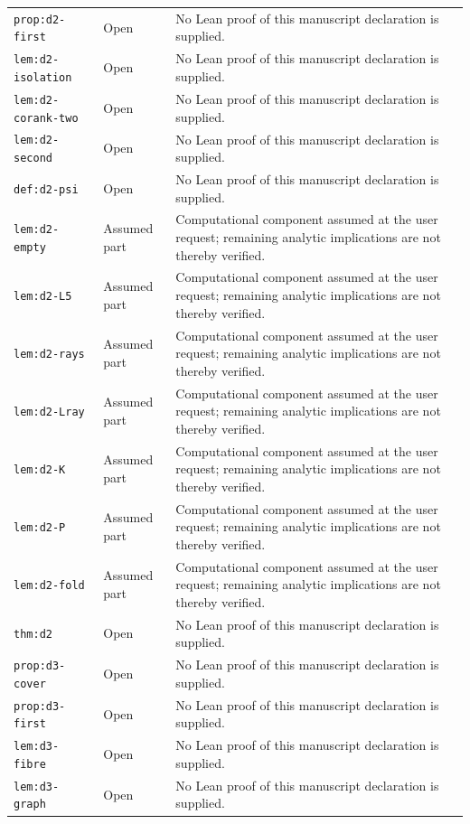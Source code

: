 \documentclass[Threeside,11pt]{article}
\theoremstyle{definition}
\theoremstyle{remark}
\numberwithin{equation}{section}
\theoremstyle{remark}
\newcommand{\code}[1]{\begingroup\def\_{\textunderscore\allowbreak}\texttt{#1}\endgroup}
\begin{document}
\begin{longtable}{p{4.0cm}p{1.8cm}p{8.9cm}}
\code{prop:d2-first} & Open & No Lean proof of this manuscript declaration is supplied. \\
\code{lem:d2-isolation} & Open & No Lean proof of this manuscript declaration is supplied. \\
\code{lem:d2-corank-two} & Open & No Lean proof of this manuscript declaration is supplied. \\
\code{lem:d2-second} & Open & No Lean proof of this manuscript declaration is supplied. \\
\code{def:d2-psi} & Open & No Lean proof of this manuscript declaration is supplied. \\
\code{lem:d2-empty} & Assumed part & Computational component assumed at the user request; remaining analytic implications are not thereby verified. \\
\code{lem:d2-L5} & Assumed part & Computational component assumed at the user request; remaining analytic implications are not thereby verified. \\
\code{lem:d2-rays} & Assumed part & Computational component assumed at the user request; remaining analytic implications are not thereby verified. \\
\code{lem:d2-Lray} & Assumed part & Computational component assumed at the user request; remaining analytic implications are not thereby verified. \\
\code{lem:d2-K} & Assumed part & Computational component assumed at the user request; remaining analytic implications are not thereby verified. \\
\code{lem:d2-P} & Assumed part & Computational component assumed at the user request; remaining analytic implications are not thereby verified. \\
\code{lem:d2-fold} & Assumed part & Computational component assumed at the user request; remaining analytic implications are not thereby verified. \\
\code{thm:d2} & Open & No Lean proof of this manuscript declaration is supplied. \\
\code{prop:d3-cover} & Open & No Lean proof of this manuscript declaration is supplied. \\
\code{prop:d3-first} & Open & No Lean proof of this manuscript declaration is supplied. \\
\code{lem:d3-fibre} & Open & No Lean proof of this manuscript declaration is supplied. \\
\code{lem:d3-graph} & Open & No Lean proof of this manuscript declaration is supplied. \\

\end{longtable}
\end{document}
